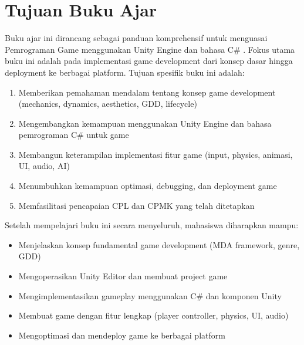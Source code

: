\section{Tujuan Buku Ajar}

Buku ajar ini dirancang sebagai panduan komprehensif untuk menguasai Pemrograman Game menggunakan Unity Engine dan bahasa C\# \cite{UnityManual2024}. Fokus utama buku ini adalah pada implementasi game development dari konsep dasar hingga deployment ke berbagai platform. Tujuan spesifik buku ini adalah:

\begin{enumerate}
  \item Memberikan pemahaman mendalam tentang konsep game development (mechanics, dynamics, aesthetics, GDD, lifecycle)
  \item Mengembangkan kemampuan menggunakan Unity Engine dan bahasa pemrograman C\# untuk game
  \item Membangun keterampilan implementasi fitur game (input, physics, animasi, UI, audio, AI)
  \item Menumbuhkan kemampuan optimasi, debugging, dan deployment game
  \item Memfasilitasi pencapaian CPL dan CPMK yang telah ditetapkan
\end{enumerate}

Setelah mempelajari buku ini secara menyeluruh, mahasiswa diharapkan mampu:
\begin{itemize}
  \item Menjelaskan konsep fundamental game development (MDA framework, genre, GDD)
  \item Mengoperasikan Unity Editor dan membuat project game
  \item Mengimplementasikan gameplay menggunakan C\# dan komponen Unity
  \item Membuat game dengan fitur lengkap (player controller, physics, UI, audio)
  \item Mengoptimasi dan mendeploy game ke berbagai platform
\end{itemize}
